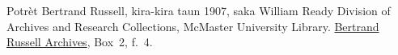 Potrèt Bertrand Russell, kira-kira taun 1907, saka William Ready
Division of Archives and Research Collections, McMaster University
Library. \href{http://www.mcmaster.ca/russdocs/russell.htm}{Bertrand Russell
Archives}, Box~2, f.~4.
